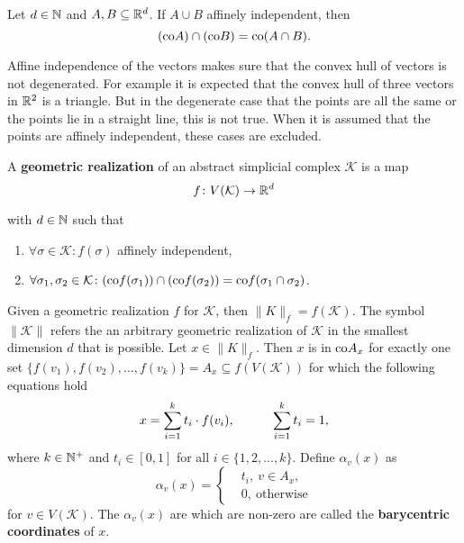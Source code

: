 \begin{rem}
  Let $d\in\mathbb{N}$ and $A,B \subseteq \mathbb{R}^d$. If $A \cup B$ affinely independent, then
  \begin{equation*}
    ({\rm co} A) \cap ({\rm co}B) = {\rm co}(A \cap B).
  \end{equation*}
\end{rem}

Affine independence of the vectors makes sure that the convex hull of vectors is not degenerated.
For example it is expected that the convex hull of three vectors in $\mathbb{R}^2$ is a triangle. But in the degenerate case that the points are all the same
or the points lie in a straight line, this is not true. When it is assumed that the points are affinely independent, these cases are excluded. 

\begin{defin}
  A \textbf{geometric realization} of an abstract simplicial complex $\mathcal{K}$ is a map
  \begin{equation*}
    f\colon V(\mathcal{K}) \to \mathbb{R}^d
  \end{equation*}

  with $d \in \mathbb{N}$ such that
  \begin{enumerate}
    \item $\forall \sigma \in \mathcal{K}\colon f(\sigma)$ affinely independent,
    \item $\forall \sigma_1, \sigma_2\in \mathcal{K}\colon ({\rm co}f(\sigma_1)) \cap ({\rm co} f(\sigma_2)) = {\rm co}f(\sigma_1 \cap \sigma_2)$.
  \end{enumerate}
    Given a geometric realization $f$ for $\mathcal{K}$, then $\lVert K \rVert_f = f(\mathcal{K})$. The symbol $\lVert \mathcal{K} \rVert$ refers the an arbitrary geometric realization of $\mathcal{K}$ in the smallest dimension $d$ that is possible.
    Let $x \in \lVert K \rVert_f$. Then $x$ is in ${\rm co}A_x$ for exactly one set $\{f(v_1), f(v_2), \ldots, f(v_k)\} = A_x \subseteq f(V(\mathcal{K}))$ for which the following equations hold 
    \begin{equation*}
      x = \sum\limits_{i=1}^k t_i \cdot f(v_i), \hspace*{30px} \sum\limits_{i=1}^k t_i = 1, 
    \end{equation*}
    where $k\in \mathbb{N}^+$ and $t_i \in [0, 1]$ for all $i \in \{1, 2, \ldots, k\}$. Define $\alpha_v(x)$ as
    \begin{equation*}
      \alpha_v(x) = \begin{cases}
        &t_i, \: v \in A_x, \\
        &0, \: \text{otherwise}
      \end{cases}
    \end{equation*}
    for $v \in V(\mathcal{K})$.
    The $\alpha_v(x)$ are which are non-zero are called the \textbf{barycentric coordinates} of $x$.
\end{defin} 

